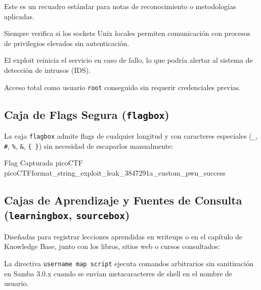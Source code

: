 \documentclass[../../main_compilation.tex]{subfiles}
\begin{document}
\begin{infobox}
	Este es un recuadro estándar para notas de reconocimiento o metodologías aplicadas.
\end{infobox}

\begin{tipbox}
	Siempre verifica si los sockets Unix locales permiten comunicación con procesos de privilegios elevados sin autenticación.
\end{tipbox}

\begin{warnbox}[Advertencia]
	El exploit reinicia el servicio en caso de fallo, lo que podría alertar al sistema de detección de intrusos (IDS).
\end{warnbox}

\begin{alertbox}
	Acceso total como usuario \texttt{root} conseguido sin requerir credenciales previas.
\end{alertbox}

\subsection{Caja de Flags Segura (\texttt{flagbox})}
La caja \texttt{flagbox} admite flags de cualquier longitud y con caracteres especiales (\texttt{\_}, \texttt{\#}, \texttt{\%}, \texttt{\&}, \texttt{\{ \}}) sin necesidad de escaparlos manualmente:

\begin{flagbox}{Flag Capturada picoCTF}
	picoCTF{format_string_exploit_leak_3847291a_custom_pwn_success}
\end{flagbox}

\subsection{Cajas de Aprendizaje y Fuentes de Consulta (\texttt{learningbox}, \texttt{sourcebox})}
Diseñadas para registrar lecciones aprendidas en writeups o en el capítulo de Knowledge Base, junto con los libros, sitios web o cursos consultados:

\begin{learningbox}
	La directiva \texttt{username map script} ejecuta comandos arbitrarios sin sanitización en Samba 3.0.x cuando se envían metacaracteres de shell en el nombre de usuario.
\end{learningbox}
\end{document}
